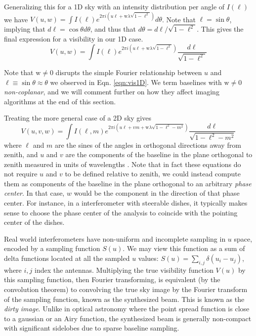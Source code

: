 {Generalizing this for a 1D sky with an intensity distribution per angle of $I(\ell)$ we have $V(u,w)=\int I(\ell)e^{2\pi i (u\ell+\text{w}\lambda\sqrt{1-\ell^2})}d\theta$. Note that $\ell=\sin\theta$, implying that $d\ell=\cos\theta d\theta$, and thus that $d\theta=d\ell/\sqrt{1-\ell^2}$. This gives the final expression for a visibility in our 1D case.
\begin{equation}
V(u,w)=\int I(\ell)e^{2\pi i (u\ell+\text{w}\lambda\sqrt{1-\ell^2})}\frac{d\ell}{\sqrt{1-\ell^2}}
\end{equation}

Note that $\text{w}\neq0$ disrupts the simple Fourier relationship between $u$ and $\ell\equiv\sin\theta\approx\theta$ we observed in Eqn. \ref{eqn:vis1D}. We term baselines with $\text{w}\neq0$ \textit{non-coplanar}, and we will comment further on how they affect imaging algorithms at the end of this section.

Treating the more general case of a 2D sky gives 
\begin{equation}
V(u,v,w)=\int I(\ell,m)e^{2\pi i (u\ell+vm+\text{w}\lambda\sqrt{1-\ell^2-m^2})}\frac{d\ell}{\sqrt{1-\ell^2-m^2}}
\end{equation}
where $\ell$ and $m$ are the sines of the angles in orthogonal directions away from zenith, and $u$ and $v$ are the components of the baseline in the plane orthogonal to zenith measured in units of wavelengths \citep{thompsonmoranswenson}. Note that in fact these equations do not require $u$ and $v$ to be defined relative to zenith, we could instead compute them as components of the baseline in the plane orthogonal to an arbitrary \textit{phase center}. In that case, $w$ would be the component in the direction of that phase center. For instance, in a interferometer with steerable dishes, it typically makes sense to choose the phase center of the analysis to coincide with the pointing center of the dishes. 

Real world interferometers have non-uniform and incomplete sampling in $u$ space, encoded by a sampling function $S(u)$. We may view this function as a sum of delta functions located at all the sampled $u$ values: $S(u)=\sum_{i,j}\delta(u_i-u_j)$, where $i,j$ index the antennas. Multiplying the true visibility function $V(u)$ by this sampling function, then Fourier transforming, is equivalent (by the convolution theorem) to convolving the true sky image by the Fourier transform of the sampling function, known as the synthesized beam. This is known as the \textit{dirty image}. Unlike in optical astronomy where the point spread function is close to a gaussian or an Airy function, the synthesized beam is generally non-compact with significant sidelobes due to sparse baseline sampling.  

}
